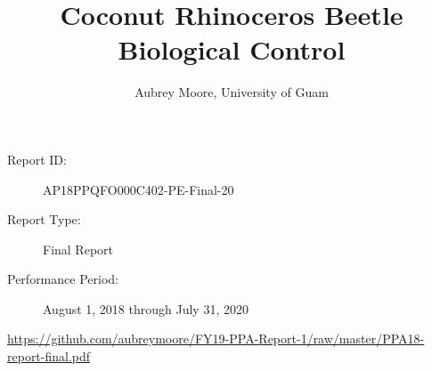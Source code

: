 \documentclass[12pt,
letterpaper,english,bibliography=totocnumbered, abstract=on]{scrartcl}
\begin{document}
\titlehead{USDA-APHIS Final Report}
\title{Coconut Rhinoceros Beetle Biological Control}
\author{Aubrey Moore, University of Guam}
\maketitle
\begin{description}	
	\item[Report ID:] AP18PPQFO000C402-PE-Final-20
	\item[Report Type:] Final Report
	\item[Performance Period:] August 1, 2018 through July 31, 2020
\end{description}

\begin{footnotesize}
\url{https://github.com/aubreymoore/FY19-PPA-Report-1/raw/master/PPA18-report-final.pdf}
\end{footnotesize}

\newpage{}
\end{document}
